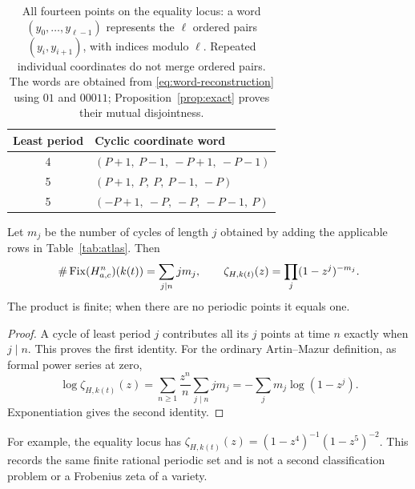\begin{table}[htbp]
\centering
\begin{tabular}{@{}cl@{}}
\toprule
Least period & Cyclic coordinate word\\
\midrule
4 & $(P+1,\ P-1,\ -P+1,\ -P-1)$\\
5 & $(P+1,\ P,\ P,\ P-1,\ -P)$\\
5 & $(-P+1,\ -P,\ -P,\ -P-1,\ P)$\\
\bottomrule
\end{tabular}
\caption{All fourteen points on the equality locus: a word
$(y_0,\ldots,y_{\ell-1})$ represents the $\ell$ ordered pairs
$(y_i,y_{i+1})$, with indices modulo $\ell$. Repeated individual
coordinates do not merge ordered pairs. The words are obtained
from \eqref{eq:word-reconstruction} using $01$ and $00011$;
Proposition~\ref{prop:exact} proves their mutual disjointness.}
\label{tab:sharp}
\end{table}

\begin{corollary}\label{cor:zeta}
Let $m_j$ be the number of cycles of length $j$ obtained by adding
the applicable rows in Table~\ref{tab:atlas}. Then
\begin{equation}\label{eq:zeta}
 \#\operatorname{Fix}(H_{a,c}^n)(k(t))=\sum_{j\mid n}j m_j,\qquad
 \zeta_{H,k(t)}(z)=\prod_j(1-z^j)^{-m_j}.
\end{equation}
The product is finite; when there are no periodic points it equals one.
\end{corollary}
\begin{proof}
A cycle of least period $j$ contributes all its $j$ points at
time $n$ exactly when $j\mid n$. This proves the first identity.
For the ordinary Artin--Mazur definition, as formal power series
at zero,
\[
 \log\zeta_{H,k(t)}(z)
 =\sum_{n\ge1}\frac{z^n}{n}\sum_{j\mid n}j m_j
 =-\sum_jm_j\log(1-z^j).
\]
Exponentiation gives the second identity.
\end{proof}

For example, the equality locus has
$\zeta_{H,k(t)}(z)=(1-z^4)^{-1}(1-z^5)^{-2}$.
This records the same finite rational periodic set and is not a
second classification problem or a Frobenius zeta of a variety.
